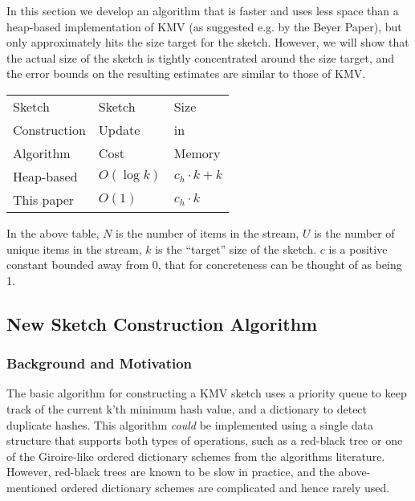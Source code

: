 \documentclass{sig-alternate}
\begin{document}
In this section we develop an algorithm that is faster and uses less
space than a heap-based implementation of KMV (as suggested e.g. by the Beyer
Paper), but only approximately hits the size target for the sketch.
However, we will show that the actual size of the sketch is tightly
concentrated around the size target, and the error bounds on the resulting
estimates are similar to those of KMV.


\begin{center}
{\footnotesize
\begin{tabular}{|l|l|l|}
\hline 
Sketch        & Sketch & Size \\
Construction  & Update & in   \\
Algorithm     &  Cost  & Memory \\
\hline
Heap-based & $O(\log k)$ & $c_h \cdot k + k$ \\
This paper & $O(1)     $ & $c_h \cdot k$ \\
\hline 
\end{tabular}}
\end{center}

In the above table, $N$ is the number of items in the stream, $U$ is the number of unique items
in the stream, $k$ is the ``target'' size of the sketch. $c$ is a positive constant bounded away
from 0, that for concreteness can be thought of as being 1.

\subsection{New Sketch Construction Algorithm}

\subsubsection{Background and Motivation}

The basic algorithm for constructing a KMV sketch uses a priority
queue to keep track of the current k'th minimum hash value, and a
dictionary to detect duplicate hashes. This algorithm {\em could} be implemented
using a single data structure that supports both types of operations,
such as a red-black tree or one of the Giroire-like ordered dictionary schemes from the algorithms
literature. However, red-black trees are known to be slow in practice, and the
above-mentioned ordered dictionary schemes are complicated and hence rarely used.
\end{document}
